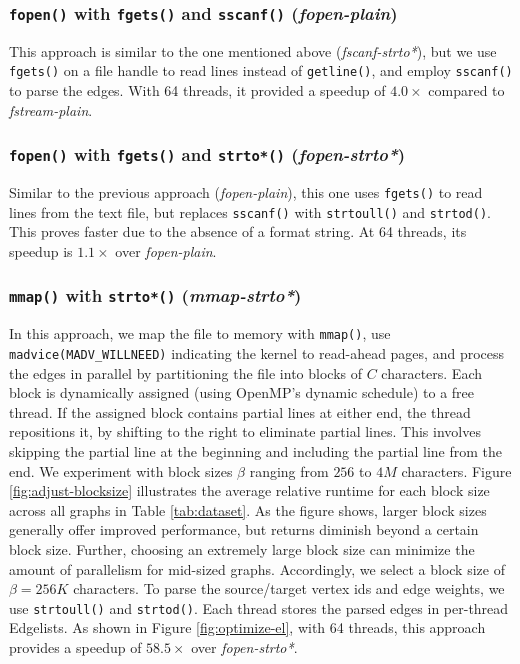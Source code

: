 \subsubsection{\texttt{fopen()} with \texttt{fgets()} and \texttt{sscanf()} (\textit{fopen-plain})}
\label{sec:el-fopen-plain}

This approach is similar to the one mentioned above (\textit{fscanf-strto*}), but we use \texttt{fgets()} on a file handle to read lines instead of \texttt{getline()}, and employ \texttt{sscanf()} to parse the edges. With 64 threads, it provided a speedup of $4.0\times$ compared to \textit{fstream-plain}.


\subsubsection{\texttt{fopen()} with \texttt{fgets()} and \texttt{strto*()} (\textit{fopen-strto*})}
\label{sec:el-fopen-strto*}

Similar to the previous approach (\textit{fopen-plain}), this one uses \texttt{fgets()} to read lines from the text file, but replaces \texttt{sscanf()} with \texttt{strtoull()} and \texttt{strtod()}. This proves faster due to the absence of a format string. At 64 threads, its speedup is $1.1\times$ over \textit{fopen-plain}.


\subsubsection{\texttt{mmap()} with \texttt{strto*()} (\textit{mmap-strto*})}
\label{sec:el-mmap-strto*}

In this approach, we map the file to memory with \texttt{mmap()}, use \texttt{madvice(MADV\_WILLNEED)} indicating the kernel to read-ahead pages, and process the edges in parallel by partitioning the file into blocks of $C$ characters. Each block is dynamically assigned (using OpenMP's dynamic schedule) to a free thread. If the assigned block contains partial lines at either end, the thread repositions it, by shifting to the right to eliminate partial lines. This involves skipping the partial line at the beginning and including the partial line from the end. We experiment with block sizes $\beta$ ranging from $256$ to $4M$ characters. Figure \ref{fig:adjust-blocksize} illustrates the average relative runtime for each block size across all graphs in Table \ref{tab:dataset}. As the figure shows, larger block sizes generally offer improved performance, but returns diminish beyond a certain block size. Further, choosing an extremely large block size can minimize the amount of parallelism for mid-sized graphs. Accordingly, we select a block size of $\beta=256K$ characters. To parse the source/target vertex ids and edge weights, we use \texttt{strtoull()} and \texttt{strtod()}. Each thread stores the parsed edges in per-thread Edgelists. As shown in Figure \ref{fig:optimize-el}, with 64 threads, this approach provides a speedup of $58.5\times$ over \textit{fopen-strto*}.

